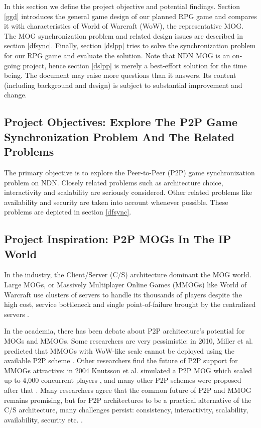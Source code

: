 \documentclass{article}
\begin{document}
In this section we define the project objective and potential findings. Section \ref{ggd} introduces the general game design of our planned RPG game and compares it with characteristics of World of Warcraft (WoW), the representative MOG. The MOG synchronization problem and related design issues are described in section \ref{dfsync}. Finally, section \ref{dslpp} tries to solve the synchronization problem for our RPG game and evaluate the solution. Note that NDN MOG is an on-going project, hence section \ref{dslpp} is merely a best-effort solution for the time being. The document may raise more questions than it answers. Its content (including background and design) is subject to substantial improvement and change.

\subsection{Project Objectives: Explore The P2P Game Synchronization Problem And The Related Problems}
The primary objective is to explore the Peer-to-Peer (P2P) game synchronization problem on NDN. Closely related problems such as architecture choice, interactivity and scalability are seriously considered. Other related problems like availability and security are taken into account whenever possible. These problems are depicted in section \ref{dfsync}.

\subsection{Project Inspiration: P2P MOGs In The IP World}
In the industry, the Client/Server (C/S) architecture dominant the MOG world. Large MOGs, or Massively Multiplayer Online Games (MMOGs) like World of Warcraft use clusters of servers to handle its thousands of players despite the high cost, service bottleneck and single point-of-failure brought by the centralized servers \cite{Neumann07, Fan10}.

In the academia, there has been debate about P2P architecture's potential for MOGs and MMOGs. Some researchers are very pessimistic: in 2010, Miller et al. predicted that MMOGs with WoW-like scale cannot be deployed using the available P2P scheme \cite{Miller10}. Other researchers find the future of P2P support for MMOGs attractive: in 2004 Knutsson et al. simulated a P2P MOG which scaled up to 4,000 concurrent players \cite{Knutsson04}, and many other P2P schemes were proposed after that \cite{Fan10}. Many researchers agree that the common future of P2P and MMOG remains promising, but for P2P architectures to be a practical alternative of the C/S architecture, many challenges persist: consistency, interactivity, scalability, availability, security etc. \cite{Neumann07, Fan10, Gilmore12}.
\end{document}
